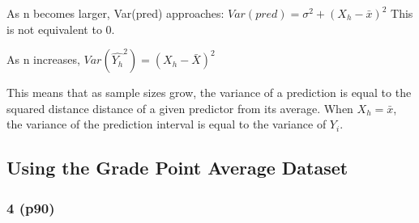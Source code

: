 \documentclass[11pt]{article}
\begin{document}
As n becomes larger, Var(pred) approaches: \(Var(pred) = \sigma^2 + (X_h -
\bar{x})^2\)
This is not equivalent to 0.

As n increases, \(Var(\hat{Y_h}^2) = (X_h - \bar{X})^2\)

This means that as sample sizes grow, the variance of a prediction is equal to
the squared distance distance of a given predictor from its average. When \(X_h =
\bar{x}\), the variance of the prediction interval is equal to the variance of
\(Y_i\).


\subsection{Using the Grade Point Average Dataset}
\label{sec:orgc3d2a8a}
\subsubsection{4 (p90)}
\label{sec:org1d3cbcb}
\end{document}
